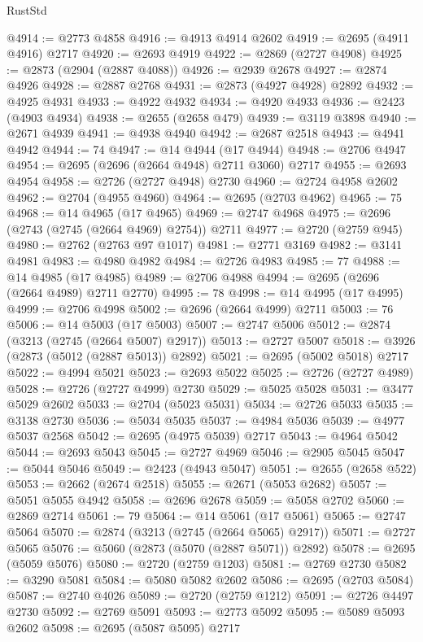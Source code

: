 \begin{lexlean}{RustStd}
\begin{coremodule}
@4914 := @2773 @4858
@4916 := @4913 @4914 @2602
@4919 := @2695 (@4911 @4916) @2717
@4920 := @2693 @4919
@4922 := @2869 (@2727 @4908)
@4925 := @2873 (@2904 (@2887 @4088))
@4926 := @2939 @2678
@4927 := @2874 @4926
@4928 := @2887 @2768
@4931 := @2873 (@4927 @4928) @2892
@4932 := @4925 @4931
@4933 := @4922 @4932
@4934 := @4920 @4933
@4936 := @2423 (@4903 @4934)
@4938 := @2655 (@2658 @479)
@4939 := @3119 @3898
@4940 := @2671 @4939
@4941 := @4938 @4940
@4942 := @2687 @2518
@4943 := @4941 @4942
@4944 := 74
@4947 := @14 @4944 (@17 @4944)
@4948 := @2706 @4947
@4954 := @2695 (@2696 (@2664 @4948) @2711 @3060) @2717
@4955 := @2693 @4954
@4958 := @2726 (@2727 @4948) @2730
@4960 := @2724 @4958 @2602
@4962 := @2704 (@4955 @4960)
@4964 := @2695 (@2703 @4962)
@4965 := 75
@4968 := @14 @4965 (@17 @4965)
@4969 := @2747 @4968
@4975 := @2696 (@2743 (@2745 (@2664 @4969) @2754)) @2711
@4977 := @2720 (@2759 @945)
@4980 := @2762 (@2763 @97 @1017)
@4981 := @2771 @3169
@4982 := @3141 @4981
@4983 := @4980 @4982
@4984 := @2726 @4983
@4985 := 77
@4988 := @14 @4985 (@17 @4985)
@4989 := @2706 @4988
@4994 := @2695 (@2696 (@2664 @4989) @2711 @2770)
@4995 := 78
@4998 := @14 @4995 (@17 @4995)
@4999 := @2706 @4998
@5002 := @2696 (@2664 @4999) @2711
@5003 := 76
@5006 := @14 @5003 (@17 @5003)
@5007 := @2747 @5006
@5012 := @2874 (@3213 (@2745 (@2664 @5007) @2917))
@5013 := @2727 @5007
@5018 := @3926 (@2873 (@5012 (@2887 @5013)) @2892)
@5021 := @2695 (@5002 @5018) @2717
@5022 := @4994 @5021
@5023 := @2693 @5022
@5025 := @2726 (@2727 @4989)
@5028 := @2726 (@2727 @4999) @2730
@5029 := @5025 @5028
@5031 := @3477 @5029 @2602
@5033 := @2704 (@5023 @5031)
@5034 := @2726 @5033
@5035 := @3138 @2730
@5036 := @5034 @5035
@5037 := @4984 @5036
@5039 := @4977 @5037 @2568
@5042 := @2695 (@4975 @5039) @2717
@5043 := @4964 @5042
@5044 := @2693 @5043
@5045 := @2727 @4969
@5046 := @2905 @5045
@5047 := @5044 @5046
@5049 := @2423 (@4943 @5047)
@5051 := @2655 (@2658 @522)
@5053 := @2662 (@2674 @2518)
@5055 := @2671 (@5053 @2682)
@5057 := @5051 @5055 @4942
@5058 := @2696 @2678
@5059 := @5058 @2702
@5060 := @2869 @2714
@5061 := 79
@5064 := @14 @5061 (@17 @5061)
@5065 := @2747 @5064
@5070 := @2874 (@3213 (@2745 (@2664 @5065) @2917))
@5071 := @2727 @5065
@5076 := @5060 (@2873 (@5070 (@2887 @5071)) @2892)
@5078 := @2695 (@5059 @5076)
@5080 := @2720 (@2759 @1203)
@5081 := @2769 @2730
@5082 := @3290 @5081
@5084 := @5080 @5082 @2602
@5086 := @2695 (@2703 @5084)
@5087 := @2740 @4026
@5089 := @2720 (@2759 @1212)
@5091 := @2726 @4497 @2730
@5092 := @2769 @5091
@5093 := @2773 @5092
@5095 := @5089 @5093 @2602
@5098 := @2695 (@5087 @5095) @2717

\end{coremodule}
\end{lexlean}
